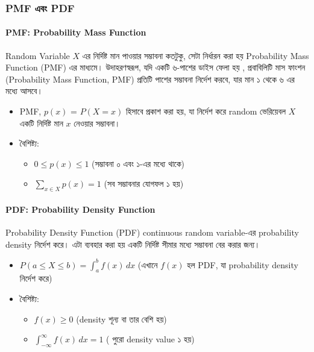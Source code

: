 \documentclass[graybox, envcountchap, twocolumn]{styles/svmult}
\begin{document}
\subsubsection{PMF {\bengalifont এবং} PDF}
\paragraph{PMF: Probability Mass Function}
{\bengalifont
Random Variable $X$ এর নির্দিষ্ট মান পাওয়ার সম্ভাবনা কতটুকু, সেটা নির্ধারন করা হয় Probability Mass Function (PMF) এর মাধ্যমে। উদাহরণস্বরূপ,  যদি একটি ৬-পাশের ডাইস ফেলা হয় , প্রবাবিলিটি মাস ফাংশন (Probability Mass Function, PMF) প্রতিটি পাশের সম্ভাবনা নির্দেশ করবে, যার মান ১ থেকে ৬ এর মধ্যে আসবে।
}
\begin{itemize}
    \item PMF,  $p(x)$ = $P(X=x)$ {\bengalifont হিসাবে প্রকাশ করা হয়, যা নির্দেশ করে random ভেরিয়েবল} $X$ {\bengalifont একটি নির্দিষ্ট মান } $x$ {\bengalifont নেওয়ার সম্ভাবনা। }
    \item {\bengalifont বৈশিষ্ট্য:}
    \begin{itemize}
        \item $0 ≤ p(x) ≤ 1$ {\bengalifont (সম্ভাবনা ০ এবং ১-এর মধ্যে থাকে)}
        \item $\sum_{x \in X} p(x) = 1$ {\bengalifont (সব সম্ভাবনার যোগফল ১ হয়)}
    \end{itemize}
\end{itemize}


\paragraph{PDF: Probability Density Function}

{\bengalifont Probability Density Function (PDF) continuous random variable-এর probability density নির্দেশ করে। এটা ব্যবহার করা হয় একটি নির্দিষ্ট সীমার মধ্যে সম্ভাবনা বের করার জন্য। }

\begin{itemize}
    \item $P(a \leq X \leq b) = \int_{a}^{b} f(x) \, dx$ {\bengalifont (এখানে $f(x)$ হল PDF, যা probability density নির্দেশ করে)}
    \item {\bengalifont বৈশিষ্ট্য:}
    \begin{itemize}
        \item $f(x) \geq 0$ {\bengalifont (density  শূন্য বা তার বেশি হয়)}
        \item $\int_{-\infty}^{\infty} f(x) \, dx = 1$ {\bengalifont ( পুরো density value ১ হয়)}
    \end{itemize}
\end{itemize}
\end{document}
